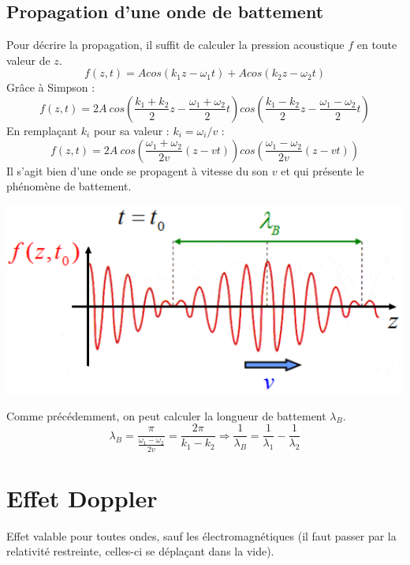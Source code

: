 \documentclass	[11pt, a4paper, openany]{book}
\begin{document}
		\subsection{Propagation d'une onde de battement}
		Pour décrire la propagation, il suffit de calculer la pression acoustique $f$ en toute valeur de $z$.
		\begin{equation}
			f(z, t) = Acos(k_1z - \omega_1 t) + Acos(k_2z - \omega_2 t)
		\end{equation}
		Grâce à Simpson : 
		\begin{equation}
			f(z, t) = 2A\ cos\left(\frac{k_1 + k_2}{2}z - \frac{\omega_1 + \omega_2}{2}t\right)cos\left(\frac{k_1 - k_2}{2}z - \frac{\omega_1 - \omega_2}{2}t\right)
		\end{equation}
		En remplaçant $k_i$ pour sa valeur  : $k_i = \omega_i/v$ :
		\begin{equation}
			f(z, t) = 2A\ cos\left(\frac{\omega_1 + \omega_2}{2v}(z - vt)\right)cos\left(\frac{\omega_1 - \omega_2}{2v}(z - vt)\right)
		\end{equation}
		Il s'agit bien d'une onde se propagent à vitesse du son $v$ et qui présente le phénomène de battement.
		\begin{center}
			\includegraphics[scale=0.4]{oo/image40.png}
		\end{center}
		Comme précédemment, on peut calculer la longueur de battement $\lambda_B$.
		\begin{equation}
			\lambda_B = \frac{\pi}{\frac{\omega_1 - \omega_2}{2v}} = \frac{2\pi}{k_1 - k_2} \Rightarrow \frac{1}{\lambda_B} = \frac{1}{\lambda_1} - \frac{1}{\lambda_2}
		\end{equation}
		
		\section{Effet Doppler}
		Effet valable pour toutes ondes, sauf les électromagnétiques (il faut passer par la relativité restreinte, celles-ci se déplaçant dans la vide).
		
\end{document}
